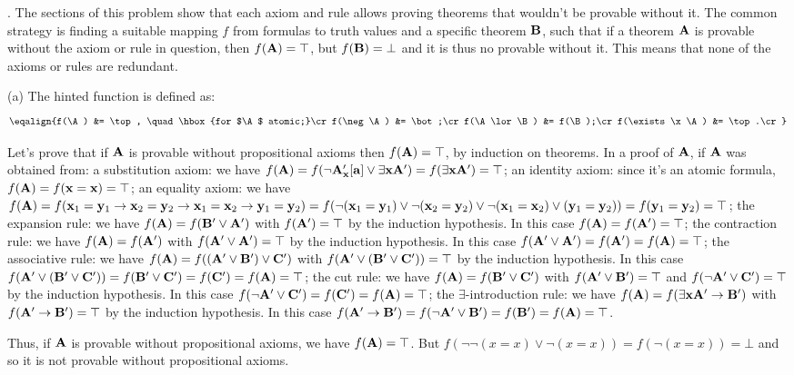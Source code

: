 . The sections of this problem show that each axiom and rule allows
proving theorems that wouldn't be provable without it. The common strategy
is finding a suitable mapping $f$ from formulas to truth values and a specific 
theorem ${\bf B}$, such that if a theorem ${\bf A}$ is provable without the axiom or rule in 
question, then $f({\bf A}) = \top$, but $f({\bf B}) = \bot$ and it is thus no provable
without it. This means that none of the axioms or rules are redundant.
\smallskip

\ansitem (a)
The hinted function is defined as:
$$\eqalign{f(\A) &= \top, \quad \hbox{for $\A$ atomic;}\cr
f(\neg \A) &= \bot;\cr
f(\A \lor \B) &= f(\B);\cr
f(\exists \x\A) &= \top.\cr}$$

Let's prove that if ${\bf A}$ is provable without propositional axioms then $f({\bf A}) = \top$, by induction on theorems.
In a proof of ${\bf A}$, if ${\bf A}$ was obtained from:
\itemitem{$\bullet$} a substitution axiom: we have 
$f({\bf A}) = f(\neg {\bf A}'_{\bf x}[{\bf a}] \lor \exists {\bf x}{\bf A}') = f(\exists {\bf x}{\bf A}') = \top$;
\itemitem{$\bullet$} an identity axiom: since it's an atomic formula, $f({\bf A}) = f({\bf x} = {\bf x}) = \top$;
\itemitem{$\bullet$} an equality axiom: we have $f({\bf A}) =
f({\bf x}_1 = {\bf y}_1 \to {\bf x}_2 = {\bf y}_2 \to {\bf x}_1 = {\bf x}_2 \to {\bf y}_1 = {\bf y}_2) =
f(\neg ({\bf x}_1 = {\bf y}_1) \lor \neg ({\bf x}_2 = {\bf y}_2) \lor \neg ({\bf x}_1 = {\bf x}_2) \lor ({\bf y}_1 = {\bf y}_2)) =
f({\bf y}_1 = {\bf y}_2) = \top$;
\itemitem{$\bullet$} the expansion rule: we have $f({\bf A}) = f({\bf B}' \lor {\bf A}')$ with $f({\bf A}') = \top$ by the induction hypothesis.
In this case $f({\bf A}) = f({\bf A}') = \top$;
\itemitem{$\bullet$} the contraction rule: we have $f({\bf A}) = f({\bf A}')$ with $f({\bf A}' \lor {\bf A}') = \top$ by the induction hypothesis. 
In this case $f({\bf A}' \lor {\bf A}') = f({\bf A}') = f({\bf A}) = \top$;
\itemitem{$\bullet$} the associative rule: we have $f({\bf A}) = f(({\bf A}' \lor {\bf B}') \lor {\bf C}')$ with $f({\bf A}' \lor ({\bf B}' \lor {\bf C}')) = \top$ by the induction hypothesis.
In this case $f({\bf A}' \lor ({\bf B}' \lor {\bf C}')) = f({\bf B}' \lor {\bf C}') = f({\bf C}') = f({\bf A}) = \top$;
\itemitem{$\bullet$} the cut rule: we have $f({\bf A}) = f({\bf B}' \lor {\bf C}')$ with $f({\bf A}' \lor {\bf B}') = \top$ and $f(\neg {\bf A}' \lor {\bf C}') = \top$ by the induction hypothesis.
In this case $f(\neg {\bf A}' \lor {\bf C}') = f({\bf C}') = f({\bf A}) = \top$;
\itemitem{$\bullet$} the $\exists$-introduction rule: we have $f({\bf A}) = f(\exists {\bf x}{\bf A}' \to {\bf B}')$ with $f({\bf A}' \to {\bf B}') = \top$ by the induction hypothesis.
In this case $f({\bf A}' \to {\bf B}') = f(\neg {\bf A}' \lor {\bf B}') = f({\bf B}') = f({\bf A}) = \top$.

Thus, if ${\bf A}$ is provable without propositional axioms, we have $f({\bf A}) = \top$.
But $f(\neg \neg (x=x) \lor \neg (x=x)) = f(\neg (x=x)) = \bot$ and so it is not provable without propositional axioms.
\smallskip

